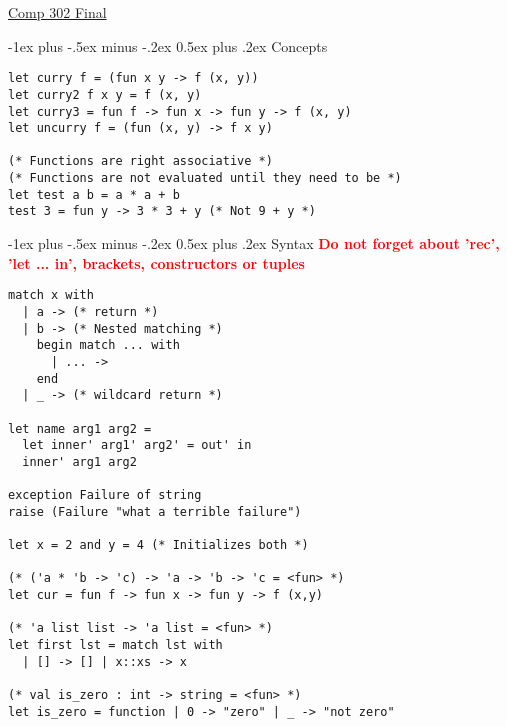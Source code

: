 \documentclass[12pt]{article}
\makeatletter
\renewcommand{\section}{\@startsection{section}{1}{0mm}%
                                    {-1ex plus -.5ex minus -.2ex}%
                                    {0.5ex plus .2ex}%
                                    {\normalfont\large\bfseries\color{header}}}
\makeatother
\begin{document}
\raggedright
\footnotesize
\begin{multicols}{2}


	\setlength{\premulticols}{1pt}
	\setlength{\postmulticols}{1pt}
	\setlength{\multicolsep}{10pt}
	\setlength{\columnsep}{2pt}



	\begin{center}
		\Large{\underline{Comp 302 Final}} \\
	\end{center}

	\section{Concepts}
	\begin{lstlisting}
let curry f = (fun x y -> f (x, y))
let curry2 f x y = f (x, y)
let curry3 = fun f -> fun x -> fun y -> f (x, y)
let uncurry f = (fun (x, y) -> f x y)

(* Functions are right associative *)
(* Functions are not evaluated until they need to be *)
let test a b = a * a + b
test 3 = fun y -> 3 * 3 + y (* Not 9 + y *)
	\end{lstlisting}


    \section{Syntax}
    \textcolor{red}{\textbf{Do not forget about 'rec', 'let ... in', brackets, constructors or tuples}}
	\begin{lstlisting}
match x with
  | a -> (* return *)
  | b -> (* Nested matching *)
    begin match ... with 
      | ... ->
    end
  | _ -> (* wildcard return *)
  
let name arg1 arg2 =
  let inner' arg1' arg2' = out' in
  inner' arg1 arg2
  
exception Failure of string
raise (Failure "what a terrible failure")

let x = 2 and y = 4 (* Initializes both *)

(* ('a * 'b -> 'c) -> 'a -> 'b -> 'c = <fun> *)
let cur = fun f -> fun x -> fun y -> f (x,y)

(* 'a list list -> 'a list = <fun> *)
let first lst = match lst with
  | [] -> [] | x::xs -> x

(* val is_zero : int -> string = <fun> *)
let is_zero = function | 0 -> "zero" | _ -> "not zero"


\end{lstlisting}
\end{multicols}
\end{document}
